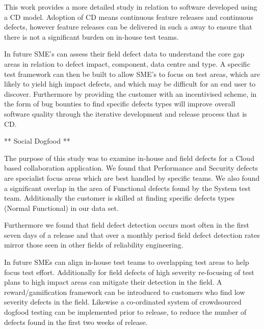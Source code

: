 This work provides a more detailed study in relation to software developed using a CD model. Adoption of CD means continuous feature releases and continuous defects, however feature releases can be delivered in such a away to ensure that there is not a significant burden on in-house test teams.  \par

 In future SME's can assess their field defect data to understand the core gap areas in relation to defect impact, component, data centre and type. A specific test framework can then be built to allow SME's to focus on test areas, which are likely to yield high impact defects, and which may be difficult for an end user to discover. 
Furthermore by providing the customer with an incentivised scheme, in the form of bug bounties to find specific defects types will improve overall software quality through the iterative development and release process that is CD. 

** Social Dogfood ** \par

The purpose of this study was to examine in-house and field defects for a Cloud based collaboration application. We
found that Performance and Security defects are specialist focus areas which are best handled by specific teams. We also found a significant overlap in the area of Functional defects found by the System test team. Additionally the customer is skilled at finding specific defects types (Normal Functional) in our data set. \par

Furthermore we found that field defect detection occurs most often in the first seven days of a release and that over a
monthly period field defect detection rates mirror those seen in other fields of reliability engineering. \par

In future SMEs can align in-house test teams to overlapping test areas to help focus test effort. Additionally for field defects of high severity re-focusing of test plans to high impact areas can mitigate their detection in the field. A reward/gamification framework can be introduced to customers who find low severity defects in the field. Likewise a co-ordinated system of crowdsourced dogfood testing can be implemented prior to release, to reduce the number of defects found in the first two weeks of release.\par





